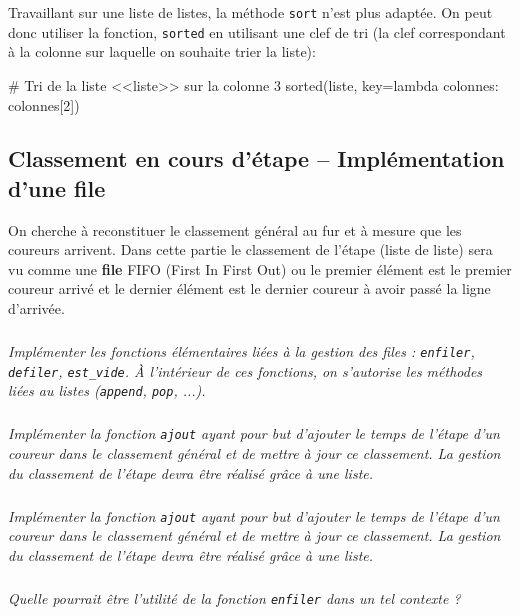 \documentclass[10pt,fleqn]{article} %
\begin{document}
\begin{multicols}{2}
\begin{rem}
Travaillant sur une liste de listes, la méthode \texttt{sort} n'est plus adaptée. On peut donc utiliser la fonction, \texttt{sorted} en utilisant une clef de tri (la clef correspondant à la colonne sur laquelle on souhaite trier la liste): 
\end{rem}
\begin{python}
# Tri de la liste <<liste>> sur la colonne 3
sorted(liste, key=lambda colonnes: colonnes[2])
\end{python}



\subsection*{Classement en cours d'étape -- Implémentation d'une file}
On cherche à reconstituer le classement général au fur et à mesure que les coureurs arrivent. Dans cette partie le classement de l'étape (liste de liste) sera vu comme une \textbf{file} FIFO (First In First Out) ou le premier élément est le premier coureur arrivé et le dernier élément est le dernier coureur à avoir passé la ligne d'arrivée.  

\subparagraph{}\textit{Implémenter les fonctions élémentaires liées à la gestion des files : \texttt{enfiler}, \texttt{defiler}, \texttt{est\_vide}. À l'intérieur de ces fonctions, on s'autorise les méthodes liées au listes (\texttt{append}, \texttt{pop}, ...).}

\subparagraph{}
\textit{Implémenter la fonction \texttt{ajout} ayant pour but d'ajouter le temps de l'étape d'un coureur dans le classement général et de mettre à jour ce classement. La gestion du classement de l'étape devra être réalisé grâce à une liste.}

\subparagraph{}
\textit{Implémenter la fonction \texttt{ajout} ayant pour but d'ajouter le temps de l'étape d'un coureur dans le classement général et de mettre à jour ce classement. La gestion du classement de l'étape devra être réalisé grâce à une liste.}

\subparagraph{}
\textit{Quelle pourrait être l'utilité de la fonction \texttt{enfiler} dans un tel contexte ?}


\end{multicols}
\end{document}

